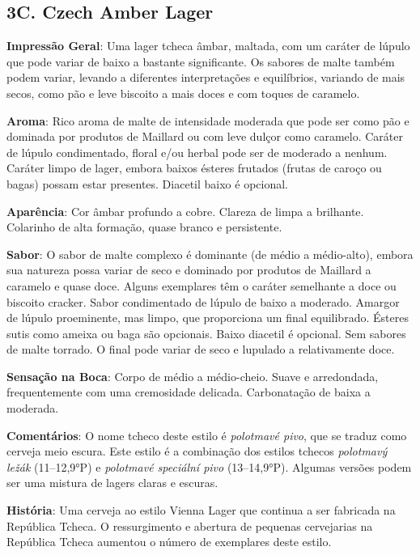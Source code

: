 \subsection*{3C. Czech Amber Lager}
\textbf{Impressão Geral}: Uma lager tcheca âmbar, maltada, com um caráter de lúpulo que pode variar de baixo a bastante significante. Os sabores de malte também podem variar, levando a diferentes interpretações e equilíbrios, variando de mais secos, como pão e leve biscoito a mais doces e com toques de caramelo.

\textbf{Aroma}: Rico aroma de malte de intensidade moderada que pode ser como pão e dominada por produtos de Maillard ou com leve dulçor como caramelo. Caráter de lúpulo condimentado, floral e/ou herbal pode ser de moderado a nenhum. Caráter limpo de lager, embora baixos ésteres frutados (frutas de caroço ou bagas) possam estar presentes. Diacetil baixo é opcional.

\textbf{Aparência}: Cor âmbar profundo a cobre. Clareza de limpa a brilhante. Colarinho de alta formação, quase branco e persistente.

\textbf{Sabor}: O sabor de malte complexo é dominante (de médio a médio-alto), embora sua natureza possa variar de seco e dominado por produtos de Maillard a caramelo e quase doce. Alguns exemplares têm o caráter semelhante a doce ou biscoito cracker. Sabor condimentado de lúpulo de baixo a moderado. Amargor de lúpulo proeminente, mas limpo, que proporciona um final equilibrado. Ésteres sutis como ameixa ou baga são opcionais. Baixo diacetil é opcional. Sem sabores de malte torrado. O final pode variar de seco e lupulado a relativamente doce.

\textbf{Sensação na Boca}: Corpo de médio a médio-cheio. Suave e arredondada, frequentemente com uma cremosidade delicada. Carbonatação de baixa a moderada.

\textbf{Comentários}: O nome tcheco deste estilo é \textit{polotmavé pivo}, que se traduz como cerveja meio escura. Este estilo é a combinação dos estilos tchecos \textit{polotmavý ležák} (11–12,9°P) e \textit{polotmavé speciální pivo} (13–14,9°P). Algumas versões podem ser uma mistura de lagers claras e escuras.

\textbf{História}: Uma cerveja ao estilo Vienna Lager que continua a ser fabricada na República Tcheca. O ressurgimento e abertura de pequenas cervejarias na República Tcheca aumentou o número de exemplares deste estilo.

